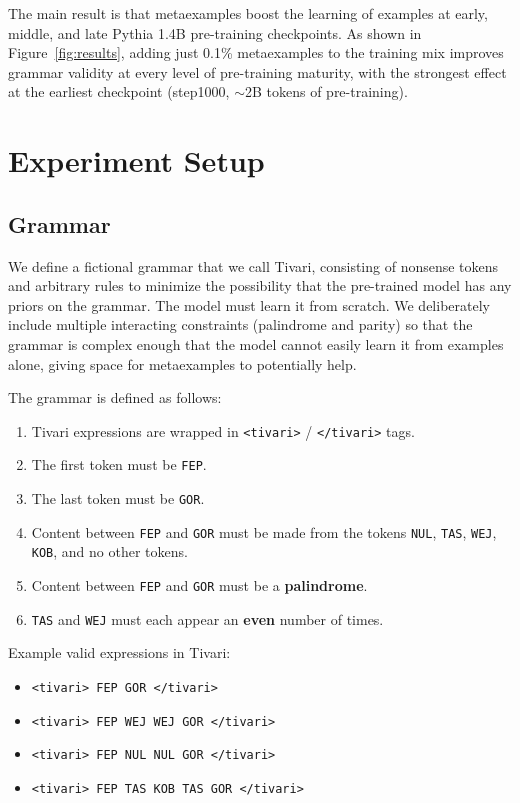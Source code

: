 \documentclass[11pt]{article}
\begin{document}
The main result is that metaexamples boost the learning of examples at early, middle, and late Pythia 1.4B pre-training checkpoints. As shown in Figure~\ref{fig:results}, adding just 0.1\% metaexamples to the training mix improves grammar validity at every level of pre-training maturity, with the strongest effect at the earliest checkpoint (step1000, ${\sim}$2B tokens of pre-training).

\section{Experiment Setup}

\subsection{Grammar}

We define a fictional grammar that we call Tivari, consisting of nonsense tokens and arbitrary rules to minimize the possibility that the pre-trained model has any priors on the grammar. The model must learn it from scratch. We deliberately include multiple interacting constraints (palindrome and parity) so that the grammar is complex enough that the model cannot easily learn it from examples alone, giving space for metaexamples to potentially help.

The grammar is defined as follows:

\begin{enumerate}
    \item Tivari expressions are wrapped in \texttt{<tivari>} / \texttt{</tivari>} tags.
    \item The first token must be \texttt{FEP}.
    \item The last token must be \texttt{GOR}.
    \item Content between \texttt{FEP} and \texttt{GOR} must be made from the tokens \texttt{NUL}, \texttt{TAS}, \texttt{WEJ}, \texttt{KOB}, and no other tokens.
    \item Content between \texttt{FEP} and \texttt{GOR} must be a \textbf{palindrome}.
    \item \texttt{TAS} and \texttt{WEJ} must each appear an \textbf{even} number of times.
\end{enumerate}

Example valid expressions in Tivari:

\begin{itemize}
    \item \texttt{<tivari> FEP GOR </tivari>}
    \item \texttt{<tivari> FEP WEJ WEJ GOR </tivari>}
    \item \texttt{<tivari> FEP NUL NUL GOR </tivari>}
    \item \texttt{<tivari> FEP TAS KOB TAS GOR </tivari>}
\end{itemize}
\end{document}
